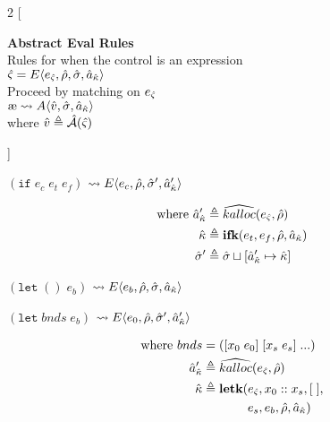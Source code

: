 \documentclass[12pt,draft]{article}
\newcommand\mae{\ensuremath{\text{\ae}}}
\newcommand{\ifsyn}[3]{(\texttt{if}\;#1\;#2\;#3)}
\begin{document}
\footnotesize{
\begin{multicols*}{2}
[
\begin{center}
\textbf{Abstract Eval Rules} \\
Rules for when the control is an expression \\
\vspace{2mm}
$\hat{\varsigma} = E\langle e_{\hat{\varsigma}} , \hat{\rho} , \hat{\sigma} , \hat{a}_{\hat{\kappa}} \rangle$ \\
Proceed by matching on $e_{\hat{\varsigma}}$ \\
\vspace{2mm}
$\mae \leadsto A\langle \aval , \astore , \akaddr \rangle$ \\
where $\hat{v} \triangleq \hat{\mathcal{A}}(\hat{\varsigma})$
\end{center}
]
\begin{center}
  $ \ifsyn{e_c}{e_t}{e_f} $
  $\leadsto E\langle e_c , \hat{\rho} , \hat{\sigma}' , \hat{a}_{\hat{\kappa}}' \rangle$
\end{center}
\vspace{-7mm}
\begin{align*}
  \text{where } \hat{a}_{\hat{\kappa}}' &\triangleq \widehat{kalloc}(e_{\hat{\varsigma}} , \hat{\rho}) \\
  \hat{\kappa} &\triangleq \textbf{ifk}(e_t, e_f, \hat{\rho} , \hat{a}_{\hat{\kappa}}) \\
  \hat{\sigma}' &\triangleq \hat{\sigma} \sqcup [\hat{a}_{\hat{\kappa}}' \mapsto \hat{\kappa}]
\end{align*}
\begin{center}
  $(\texttt{let}\;()\;e_b)$
  $\leadsto E\langle e_b , \hat{\rho} , \hat{\sigma} , \hat{a}_{\hat{\kappa}} \rangle$
\end{center}
\begin{center}
  $(\texttt{let}\;bnds\;e_b)$
  $\leadsto E\langle e_0 , \hat{\rho} , \hat{\sigma}' , \hat{a}_{\hat{\kappa}}' \rangle$
\end{center}
\vspace{-7mm}
\begin{align*}
  \text{where }
  bnds &= ([x_0\;e_0]\;[x_s\;e_s]\;...) \\
  \akaddr' &\triangleq \akalloc{\ectrl , \aenv} \\
  \akont &\triangleq \textbf{letk}(\ectrl, x_0::x_s , [\;], \\
  &\;\;\;\;\;\;\;\;\;\;\;\;\;e_s, e_b , \aenv , \akaddr) \\

\end{align*}
\end{multicols*}}
\end{document}
